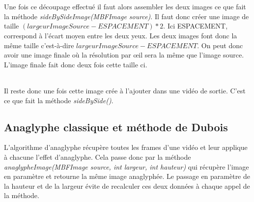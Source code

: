 \documentclass[10pt,a4paper]{article}
\begin{document}

~~\\


~~\\

Une fois ce découpage effectué il faut alors assembler les deux images ce que fait la méthode \textit{sideBySideImage(MBFImage source)}.
Il faut donc créer une image de taille $(largeurImageSource - ESPACEMENT) * 2$. Ici ESPACEMENT, correspond à l'écart moyen entre les deux yeux.
Les deux images font donc la même taille c'est-à-dire $largeurImageSource - ESPACEMENT$. On peut donc avoir une image finale où la résolution par œil sera la même que l'image source. L'image
finale fait donc deux fois cette taille ci.


~~\\

Il reste donc une fois cette image crée à l'ajouter dans une vidéo de sortie. C'est ce que fait la méthode \textit{sideBySide()}.



\subsection{Anaglyphe classique et méthode de Dubois}

L'algorithme d'anaglyphe récupère toutes les frames d'une vidéo et leur applique à chacune l'effet d'anaglyphe. Cela passe donc par la méthode \textit{anaglypheImage(MBFImage source, int largeur, int hauteur)}
qui récupère l'image en paramètre et retourne la même image anaglyphée. Le passage en paramètre de la hauteur et de la largeur évite de recalculer ces deux données à chaque appel de la méthode.
\end{document}
